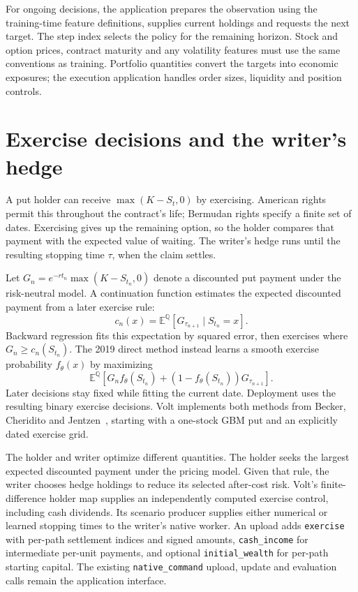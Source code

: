 \documentclass[8pt]{strategynet-journal}
\newcommand{\E}{\mathbb{E}}
\begin{document}
\begin{SNcolumns}
For ongoing decisions, the application prepares the observation using the
training-time feature definitions, supplies current holdings and requests the
next target. The step index selects the policy for the remaining horizon.
Stock and option prices, contract maturity and any volatility features must
use the same conventions as training. Portfolio quantities convert the targets
into economic exposures; the execution application handles order sizes,
liquidity and position controls.

\section{Exercise decisions and the writer's hedge}
A put holder can receive $\max(K-S_t,0)$ by exercising. American rights
permit this throughout the contract's life; Bermudan rights specify a finite
set of dates. Exercising gives up the remaining option, so the holder compares
that payment with the expected value of waiting. The writer's hedge runs
until the resulting stopping time $\tau$, when the claim settles.

Let $G_n=e^{-rt_n}\max(K-S_{t_n},0)$ denote a discounted put payment under
the risk-neutral model. A continuation function estimates the expected
discounted payment from a later exercise rule:
\[
 c_n(x)=\E^{\mathbb Q}[G_{\tau_{n+1}}\mid S_{t_n}=x].
\]
Backward regression fits this expectation by squared error, then exercises
where $G_n\geq c_n(S_{t_n})$. The 2019 direct method instead learns a smooth
exercise probability $f_\theta(x)$ by maximizing
\[
 \E^{\mathbb Q}\!\left[G_n f_\theta(S_{t_n})+
 (1-f_\theta(S_{t_n}))G_{\tau_{n+1}}\right].
\]
Later decisions stay fixed while fitting the current date. Deployment uses
the resulting binary exercise decisions. Volt implements both methods from
Becker, Cheridito and Jentzen~\cite{stopping,american}, starting with a
one-stock GBM put and an explicitly dated exercise grid.

The holder and writer optimize different quantities. The holder seeks the
largest expected discounted payment under the pricing model. Given that
rule, the writer chooses hedge holdings to reduce its selected after-cost
risk. Volt's finite-difference holder map supplies an independently computed
exercise control, including cash dividends. Its scenario producer supplies
either numerical or learned stopping times to the writer's native worker.
An upload adds \texttt{exercise} with per-path settlement indices and signed
amounts, \texttt{cash\_income} for intermediate per-unit payments, and optional
\texttt{initial\_wealth} for per-path starting capital. The existing
\texttt{native\_command} upload, update and evaluation calls remain the
application interface.


\end{SNcolumns}
\end{document}
